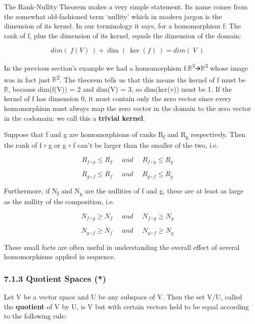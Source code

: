 \documentclass[oneside,english]{amsbook}
\numberwithin{section}{chapter}
\theoremstyle{plain}
\theoremstyle{definition}
\begin{document}
The Rank-Nullity Theorem makes a very simple statement. Its name comes
from the somewhat old-fashioned term `nullity' which in modern jargon
is the dimension of its kernel. In our terminology it says, for a
homomorphism f: The rank of f, plus the dimension of its kernel, equals
the dimension of the domain:

\[dim(\ f(V)\ ) + \dim\left( \ \ker(f)\  \right) = dim(\ V\ )\]

In the previous section's example we had a homomorphism
f:$\mathbb{R}$\textsuperscript{3}🡪$\mathbb{R}$\textsuperscript{3} whose
image was in fact just $\mathbb{R}$\textsuperscript{2}. The theorem tells
us that this means the kernel of f must be $\mathbb{R}$, because dim(f(V))
= 2 and dim(V) = 3, so dim(ker(v)) must be 1. If the kernel of f has
dimension 0, it must contain only the zero vector since every
homomorphism must always map the zero vector in the domain to the zero
vector in the codomain: we call this a \textbf{trivial kernel}.

Suppose that f and g are homomorphisms of ranks R\textsubscript{f} and
R\textsubscript{g} respectively. Then the rank of f ▫ g or g ▫ f can't
be larger than the smaller of the two, i.e.

\[R_{f \circ g} \leq R_{f}\ \ \ \ \ \ and\ \ \ \ \ \ R_{f \circ g} \leq R_{g}\]

\[R_{g \circ f} \leq R_{f}\ \ \ \ \ \ and\ \ \ \ \ \ R_{g \circ f} \leq R_{g}\]

Furthermore, if N\textsubscript{f} and N\textsubscript{g} are the
nullities of f and g, these are at least as large as the nullity of the
composition, i.e.

\[N_{f \circ g} \geq N_{f}\ \ \ \ \ \ and\ \ \ \ \ \ N_{f \circ g} \geq N_{g}\]

\[N_{g \circ f} \geq N_{f}\ \ \ \ \ \ and\ \ \ \ \ \ N_{g \circ f} \geq N_{g}\]

These small facts are often useful in understanding the overall effect
of several homomorphisms applied in sequence.

\subsubsection{7.1.3 Quotient Spaces (*)}\label{quotient-spaces}

Let V be a vector space and U be any subspace of V. Then the set V/U,
called the \textbf{quotient} of V by U, is V but with certain vectors
held to be equal according to the following rule:
\end{document}
